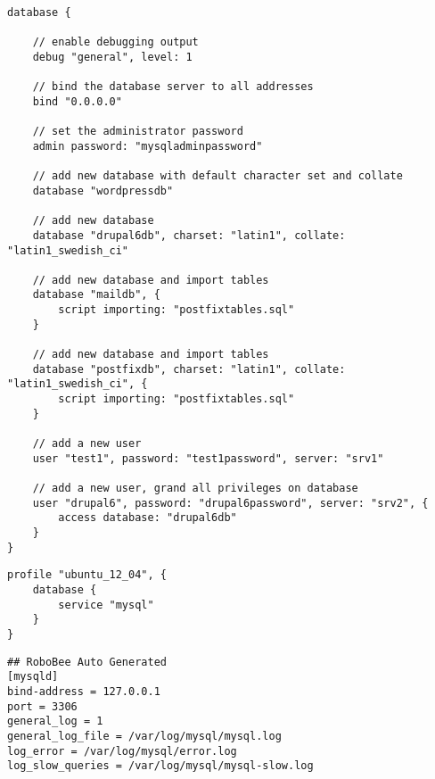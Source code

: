
\begin{lstlisting}[style=Java,label=lst:database_example_script,
title={Example script for a database. It will set the database server address, create four databases and two users.}]
database {

    // enable debugging output
    debug "general", level: 1

    // bind the database server to all addresses
    bind "0.0.0.0"

    // set the administrator password
    admin password: "mysqladminpassword"

    // add new database with default character set and collate
    database "wordpressdb"

    // add new database
    database "drupal6db", charset: "latin1", collate: "latin1_swedish_ci"

    // add new database and import tables
    database "maildb", {
        script importing: "postfixtables.sql"
    }

    // add new database and import tables
    database "postfixdb", charset: "latin1", collate: "latin1_swedish_ci", {
        script importing: "postfixtables.sql"
    }

    // add a new user
    user "test1", password: "test1password", server: "srv1"

    // add a new user, grand all privileges on database
    user "drupal6", password: "drupal6password", server: "srv2", {
        access database: "drupal6db"
    }
}
\end{lstlisting}

\begin{lstlisting}[style=Java,label=lst:database_ubuntu_profile_min,
title={Minimal Ubuntu database profile, only the database type is needed. The other profile properties are set to default values.}]
profile "ubuntu_12_04", {
    database {
        service "mysql"
    }
}
\end{lstlisting}

\begin{lstlisting}[style=rcfile_nonumbers,
label=lst:database_maincf_example,
title={Example MySQL server configuration file that is created from the database profile.
The file is saved as /etc/mysql/conf.d/sscontrol\_mysqld.cnf}]
## RoboBee Auto Generated
[mysqld]
bind-address = 127.0.0.1
port = 3306
general_log = 1
general_log_file = /var/log/mysql/mysql.log
log_error = /var/log/mysql/error.log
log_slow_queries = /var/log/mysql/mysql-slow.log
\end{lstlisting}

